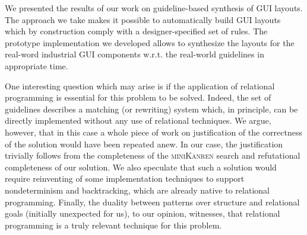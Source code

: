 
We presented the results of our work on guideline-based synthesis of GUI layouts. The approach we take makes it possible to
automatically build GUI layouts which by construction comply with a designer-specified set of rules. The prototype implementation
we developed allows to synthesize the layouts for the real-word industrial GUI components w.r.t. the real-world guidelines in
appropriate time.

One interesting question which may arise is if the application of relational programming is essential for this problem to be solved. Indeed, the set of guidelines
describes a matching (or rewriting) system which, in principle, can be directly implemented without any use of relational techniques. We argue, however,
that in this case a whole piece of work on justification of the correctness of the solution would have been repeated anew. In our
case, the justification trivially follows from the completeness of the \textsc{miniKanren} search and refutational completeness of our solution. We also speculate
that such a solution would require reinventing of some implementation techniques to support nondeterminism and backtracking, which are already native to relational
programming. Finally, the duality between patterns over structure and relational goals (initially unexpected for us), to our opinion, witnesses, that relational
programming is a truly relevant technique for this problem.



